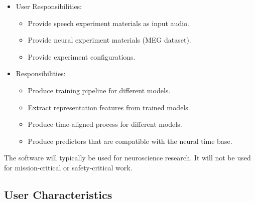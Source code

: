 \documentclass[12pt]{article}
\begin{document}




\begin{itemize}
\item User Responsibilities:
\begin{itemize}
\item Provide speech experiment materials as input audio.
\item Provide neural experiment materials (MEG dataset).
\item Provide experiment configurations.
\end{itemize}
\item \progname{} Responsibilities:
\begin{itemize}
\item Produce training pipeline for different models.
\item Extract representation features from trained models.
\item Produce time-aligned process for different models.
\item Produce predictors that are compatible with the neural time base.

\end{itemize}
\end{itemize}


The software will typically be used for neuroscience research. It will not be used for mission-critical or safety-critical work.


















\subsection{User Characteristics} \label{SecUserCharacteristics}
\end{document}
